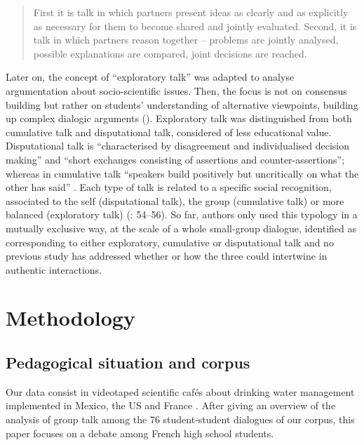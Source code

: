 \documentclass[output=paper]{langscibook}
\begin{document}
\begin{quote}
First it is talk in which partners present ideas as clearly and as explicitly as necessary for them to become shared and jointly evaluated. Second, it is talk in which partners reason together – problems are jointly analysed, possible explanations are compared, joint decisions are reached. \citep[363]{Mercer1996}
\end{quote}

Later on, the concept of “exploratory talk” was adapted to analyse argumentation about socio-scientific issues. Then, the focus is not on consensus building but rather on students’ understanding of alternative viewpoints, building up complex dialogic arguments (\citealt{Albe2006,LewisLeach2006}). Exploratory talk was distinguished from both cumulative talk and disputational talk, considered of less educational value. Disputational talk is “characterised by disagreement and individualised decision making” and “short exchanges consisting of assertions and counter-assertions”; whereas in cumulative talk “speakers build positively but uncritically on what the other has said” \citep[369]{Mercer1996}. Each type of talk is related to a specific social recognition, associated to the self (disputational talk), the group (cumulative talk) or more balanced (exploratory talk) (\citealt{WegerifMercer1997}: 54--56). So far, authors only used this typology in a mutually exclusive way, at the scale of a whole small-group dialogue, identified as corresponding to either exploratory, cumulative or disputational talk and no previous study has addressed whether or how the three could intertwine in authentic interactions.

\section{Methodology}
\subsection{Pedagogical situation and corpus} 

Our data consist in videotaped scientific cafés about drinking water management implemented in Mexico, the US and France \citep{Polo2014}. After giving an overview of the analysis of group talk among the 76 student-student dialogues of our corpus, this paper focuses on a debate among French high school students.
\end{document}
